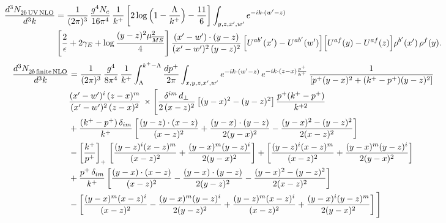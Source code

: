 \documentclass[9pt]{article}
\numberwithin{equation}{section}
\begin{document}
\begin{align}
\frac{d^{3}N_{2b\,\rm UV\, NLO}^{\rm}}{d^{3}k} & = \frac{1}{(2\pi)^{3}}\,\frac{g^{4}N_{c}}{16\pi^{4}}\,\frac{1}{k^{+}}
\left[2\log\Big(1-\frac{\Lambda}{k^{+}}\Big)-\frac{11}{6}\right]\int_{y,z,x',w'}e^{-ik\cdot(w'-z)}\notag \\ & \left[\frac{2}{\epsilon}+2\gamma_{E}+\log\frac{(y-z)^{2}\mu^{2}_{\overline{MS}}}{4}\right]
\frac{(x'-w')\cdot(y-z)}{(x'-w')^{2}\,(y-z)^{2}}\, \Big[U^{ab'}(x')-U^{ab'}(w')\Big]\Big[U^{af}(y)-U^{af}(z)\Big]\rho^{b'}(x')\,\rho^{f}(y).
\end{align}
\begin{align}
    \frac{d^{3}N_{2b\,\rm finite\, NLO}^{\rm}}{d^{3}k} & = \frac{1}{(2\pi)^{3}}\,\frac{g^{4}}{8\pi^{4}}\,\frac{1}{k^{+}}\int_{\Lambda}^{k^{+}-\Lambda}\frac{dp^{+}}{2\pi}\int_{x,y,z,x',w'}e^{-ik\cdot(w'-z)}\,e^{-ik\cdot(z-x)\frac{p^{+}}{k^{+}}}\,\frac{1}{\left[p^{+}(y-x)^{2}+(k^{+}-p^{+})(y-z)^{2}\right]}\notag \\ & \frac{(x'-w')^{i}\,(z-x)^{m}}{(x'-w')^{2}\,(z-x)^{2}}\,\times\Bigg[\frac{\delta^{im}\,d_{\perp}}{2\,(x-z)^{2}}\left[(y-x)^{2}-(y-z)^{2}\right]\frac{p^{+}(k^{+}-p^{+})}{k^{+2}}
\notag \\ & +\frac{(k^{+}-p^{+})\,\delta_{im}}{k^{+}}\left[\frac{(y-z)\cdot(x-z)}{(x-z)^{2}}+\frac{(y-x)\cdot(y-z)}{2(y-x)^{2}}-\frac{(y-x)^{2}-(y-z)^{2}}{2(x-z)^{2}}\right]\notag\\
&-\left[\frac{k^{+}}{p^{+}}\right]_{+}\,\left[\frac{(y-z)^{i}(x-z)^{m}}{(x-z)^{2}}+\frac{(y-x)^{m}(y-z)^{i}}{2(y-x)^{2}}\right]+\left[\frac{(y-z)^{i}(x-z)^{m}}{(x-z)^{2}}+\frac{(y-x)^{m}(y-z)^{i}}{2(y-x)^{2}}\right]\notag\\
&+\frac{p^{+}\,\delta_{im}}{k^{+}}\left[\frac{(y-x)\cdot(x-z)}{(x-z)^{2}}-\frac{(y-x)\cdot(y-z)}{2(y-z)^{2}}-\frac{(y-x)^{2}-(y-z)^{2}}{2(x-z)^{2}}\right]\notag\\
&-\left[\frac{(y-x)^{m}(x-z)^{i}}{(x-z)^{2}}-\frac{(y-x)^{m}(y-z)^{i}}{2(y-z)^{2}}+\frac{(y-z)^{m}(x-z)^{i}}{(x-z)^{2}}+\frac{(y-x)^{i}(y-z)^{m}}{2(y-x)^{2}}\right]\Bigg]\notag\\

\end{align}
\end{document}
